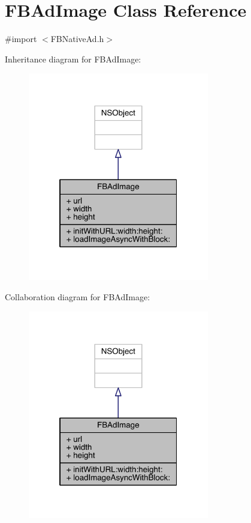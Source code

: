 \hypertarget{interface_f_b_ad_image}{\section{F\-B\-Ad\-Image Class Reference}
\label{interface_f_b_ad_image}
}


{\ttfamily \#import $<$F\-B\-Native\-Ad.\-h$>$}



Inheritance diagram for F\-B\-Ad\-Image\-:
\nopagebreak
\begin{figure}[H]
\begin{center}
\leavevmode
\includegraphics[width=224pt]{interface_f_b_ad_image__inherit__graph}
\end{center}
\end{figure}


Collaboration diagram for F\-B\-Ad\-Image\-:
\nopagebreak
\begin{figure}[H]
\begin{center}
\leavevmode
\includegraphics[width=224pt]{interface_f_b_ad_image__coll__graph}
\end{center}
\end{figure}
